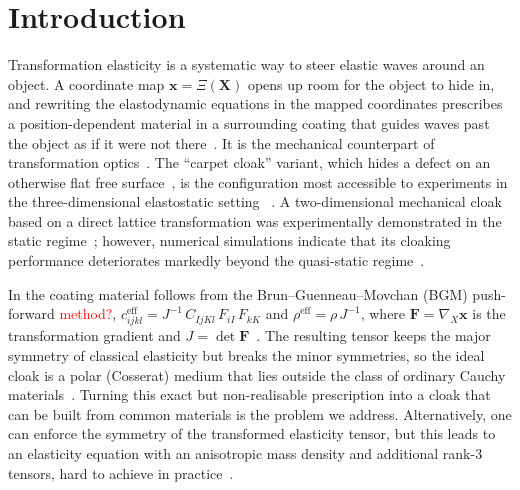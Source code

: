 \documentclass[preprint,12pt]{elsarticle}
\newcommand{\mbf}[1]{\mathbf{#1}}
\begin{document}
\section{Introduction}\label{sec:intro}

Transformation elasticity is a systematic way to steer elastic waves
around an object. A coordinate map $\mbf{x}=\Xi(\mbf{X})$ opens up room
for the object to hide in, and rewriting the elastodynamic equations in
the mapped coordinates prescribes a position-dependent material in a
surrounding coating that guides waves past the object as if it were not
there~\citep{milton2006,brun2009,norris2011,diatta2014controlling}. It is the mechanical counterpart of
transformation optics~\citep{pendry2006}. The ``carpet cloak'' variant, which
hides a defect on an otherwise flat free surface~\citep{li2008}, is the
configuration most accessible to experiments in the three-dimensional elastostatic setting ~\citep{buckmann2014elasto}. 
A two-dimensional mechanical cloak based on a direct lattice transformation was experimentally demonstrated in the static regime~\citep{buckmann2015}; however, numerical simulations indicate that its cloaking performance deteriorates markedly beyond the quasi-static regime~\citep{kadic2020elastodynamic}.

In \citep{brun2009,diatta2014controlling} the coating material follows from the Brun--Guenneau--Movchan (BGM)
push-forward \textcolor{red}{method?},
$c^{\mathrm{eff}}_{ijkl}=J^{-1}\,C_{IjKl}\,F_{iI}\,F_{kK}$ and
$\rho^{\mathrm{eff}}=\rho\,J^{-1}$, where $\mbf{F}=\nabla_{\!X}\mbf{x}$
is the transformation gradient and $J=\det\mbf{F}$~\citep{brun2009,norris2011}.
The resulting tensor keeps the major symmetry of classical elasticity but
breaks the minor symmetries, so the ideal cloak is a polar (Cosserat)
medium that lies outside the class of ordinary Cauchy
materials~\citep{milton1995,milton2006}. Turning this exact but
non-realisable prescription into a cloak that can be built from common
materials is the problem we address. Alternatively, one can enforce the symmetry of the transformed elasticity tensor, but this leads to an elasticity equation with an anisotropic mass density and additional rank-3 tensors, hard to achieve in practice~\citep{milton2006,norris2011}.
\end{document}
